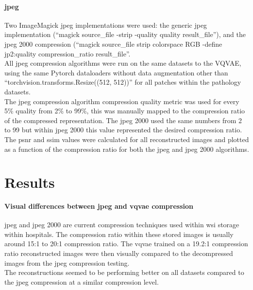 \documentclass[review]{elsarticle}
\begin{document}
    
\paragraph{\gls{jpeg}} Two ImageMagick \gls{jpeg} implementations were used: the generic \gls{jpeg} implementation (``magick {source\_file} -strip -quality {quality} {result\_file}''),
 and the \gls{jpeg} 2000 compression (``magick {source\_file} \-strip \-colorspace RGB -define jp2:quality {compression\_ratio} {result\_file}''. \\
 All \gls{jpeg} compression algorithms were run on the same datasets to the VQVAE, using the same Pytorch dataloaders without data augmentation other than “torchvision.transforms.Resize((512, 512))” for all patches within the pathology datasets. \\
 The \gls{jpeg} compression algorithm compression quality metric was used for every 5\% quality from 2\% to 99\%, this was manually mapped to the compression ratio of the compressed representation. The \gls{jpeg} 2000 used the same numbers from 2 to 99 but within \gls{jpeg} 2000 this value represented the desired compression ratio. The \gls{psnr} and \gls{ssim} values were calculated for all reconstructed images and plotted as a function of the compression ratio for both the \gls{jpeg} and \gls{jpeg} 2000 algorithms.

\section{Results}
\paragraph{Visual differences between \gls{jpeg} and \gls{vqvae} compression} \gls{jpeg} and \gls{jpeg} 2000 are current compression techniques used within \gls{wsi} storage within hospitals. The compression ratio within these stored images is usually around 15:1 to 20:1 compression ratio. The \gls{vqvae} trained on a 19.2:1 compression ratio reconstructed images were then visually compared to the decompressed images from the \gls{jpeg} compression testing. \\
The reconstructions seemed to be performing better on all datasets compared to the \gls{jpeg} compression at a similar compression level.
\end{document}
